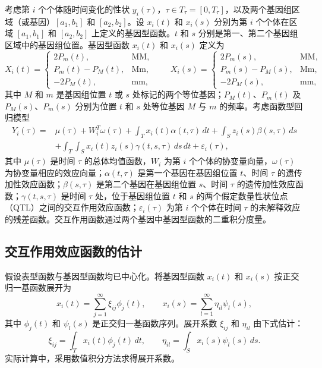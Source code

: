 考虑第 $i$ 个个体随时间变化的性状 $y_i(\tau)$，$\tau\in T_\tau=[0,T_\tau]$，以及两个基因组区域（或基因）$[a_1,b_1]$ 和 $[a_2,b_2]$。设 $x_i(t)$ 和 $x_i(s)$ 分别为第 $i$ 个个体在区域 $[a_1,b_1]$ 和 $[a_2,b_2]$ 上定义的基因型函数。$t$ 和 $s$ 分别是第一、第二个基因组区域中的基因组位置。基因型函数 $x_i(t)$ 和 $x_i(s)$ 定义为
\[
X_i(t)=\begin{cases}
2P_m(t),&\mathrm{MM},\\
P_m(t)-P_M(t),&\mathrm{Mm},\\
-2P_M(t),&\mathrm{mm},
\end{cases}
\qquad
X_i(s)=\begin{cases}
2P_m(s),&\mathrm{MM},\\
P_m(s)-P_M(s),&\mathrm{Mm},\\
-2P_M(s),&\mathrm{mm},
\end{cases}
\]
其中 $M$ 和 $m$ 是基因组位置 $t$ 或 $s$ 处标记的两个等位基因；$P_M(t)$、$P_m(t)$ 及 $P_M(s)$、$P_m(s)$ 分别为位置 $t$ 和 $s$ 处等位基因 $M$ 与 $m$ 的频率。考虑函数型回归模型
\begin{equation}
\begin{aligned}
Y_i(\tau)={}&\mu(\tau)+W_i^T\omega(\tau)
+\int_Tx_i(t)\alpha(t,\tau)\,dt
+\int_Sz_i(s)\beta(s,\tau)\,ds\\
&+\int_T\int_Sx_i(t)z_i(s)\gamma(t,s,\tau)\,ds\,dt+\varepsilon_i(\tau),
\end{aligned}
\tag{3.86}
\end{equation}
其中 $\mu(\tau)$ 是时间 $\tau$ 的总体均值函数，$W_i$ 为第 $i$ 个个体的协变量向量，$\omega(\tau)$ 为协变量相应的效应向量；$\alpha(t,\tau)$ 是第一个基因在基因组位置 $t$、时间 $\tau$ 的遗传加性效应函数；$\beta(s,\tau)$ 是第二个基因在基因组位置 $s$、时间 $\tau$ 的遗传加性效应函数；$\gamma(t,s,\tau)$ 是时间 $\tau$ 处，位于基因组位置 $t$ 和 $s$ 的两个假定数量性状位点（QTL）之间的交互作用效应函数；$\varepsilon_i(\tau)$ 为第 $i$ 个个体在时间 $\tau$ 的未解释效应的残差函数。交互作用函数通过两个基因中基因型函数的二重积分度量。

\subsection{交互作用效应函数的估计}

假设表型函数与基因型函数均已中心化。将基因型函数 $x_i(t)$ 和 $x_i(s)$ 按正交归一基函数展开为
\begin{equation}
x_i(t)=\sum_{j=1}^{\infty}\xi_{ij}\phi_j(t),\qquad
x_i(s)=\sum_{l=1}^{\infty}\eta_{il}\psi_l(s),
\tag{3.87}
\end{equation}
其中 $\phi_j(t)$ 和 $\psi_l(s)$ 是正交归一基函数序列。展开系数 $\xi_{ij}$ 和 $\eta_{il}$ 由下式估计：
\begin{equation}
\xi_{ij}=\int_Tx_i(t)\phi_j(t)\,dt,\qquad
\eta_{il}=\int_Sx_i(s)\psi_l(s)\,ds.
\tag{3.88}
\end{equation}
实际计算中，采用数值积分方法求得展开系数。

